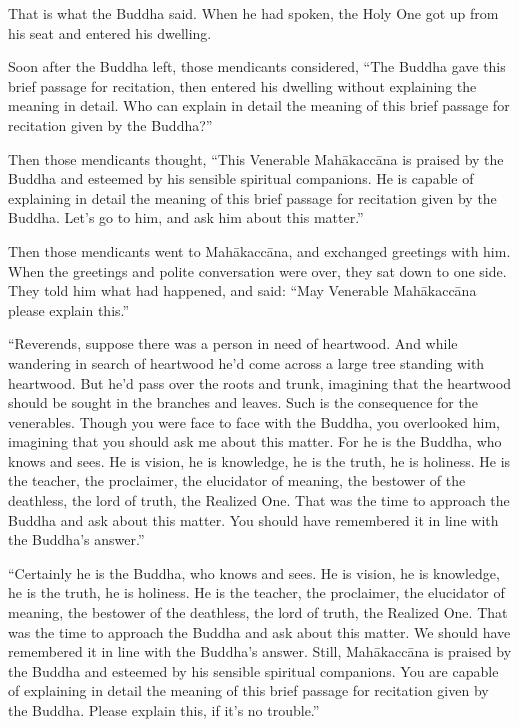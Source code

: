 \documentclass[12pt,openany]{book}%
\begin{document}
That is what the Buddha said. When he had spoken, the Holy One got up from his seat and entered his dwelling. 

Soon after the Buddha left, those mendicants considered, “The Buddha gave this brief passage for recitation, then entered his dwelling without explaining the meaning in detail. Who can explain in detail the meaning of this brief passage for recitation given by the Buddha?” 

Then those mendicants thought, “This Venerable \textsanskrit{Mahākaccāna} is praised by the Buddha and esteemed by his sensible spiritual companions. He is capable of explaining in detail the meaning of this brief passage for recitation given by the Buddha. Let’s go to him, and ask him about this matter.” 

Then those mendicants went to \textsanskrit{Mahākaccāna}, and exchanged greetings with him. When the greetings and polite conversation were over, they sat down to one side. They told him what had happened, and said: “May Venerable \textsanskrit{Mahākaccāna} please explain this.” 

“Reverends, suppose there was a person in need of heartwood. And while wandering in search of heartwood he’d come across a large tree standing with heartwood. But he’d pass over the roots and trunk, imagining that the heartwood should be sought in the branches and leaves. Such is the consequence for the venerables. Though you were face to face with the Buddha, you overlooked him, imagining that you should ask me about this matter. For he is the Buddha, who knows and sees. He is vision, he is knowledge, he is the truth, he is holiness. He is the teacher, the proclaimer, the elucidator of meaning, the bestower of the deathless, the lord of truth, the Realized One. That was the time to approach the Buddha and ask about this matter. You should have remembered it in line with the Buddha’s answer.” 

“Certainly he is the Buddha, who knows and sees. He is vision, he is knowledge, he is the truth, he is holiness. He is the teacher, the proclaimer, the elucidator of meaning, the bestower of the deathless, the lord of truth, the Realized One. That was the time to approach the Buddha and ask about this matter. We should have remembered it in line with the Buddha’s answer. Still, \textsanskrit{Mahākaccāna} is praised by the Buddha and esteemed by his sensible spiritual companions. You are capable of explaining in detail the meaning of this brief passage for recitation given by the Buddha. Please explain this, if it’s no trouble.” 
\end{document}
